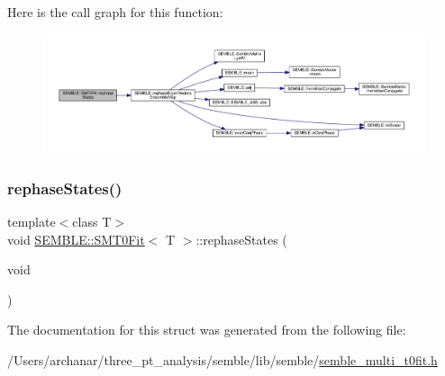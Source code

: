 Here is the call graph for this function\+:
\nopagebreak
\begin{figure}[H]
\begin{center}
\leavevmode
\includegraphics[width=350pt]{d6/dad/structSEMBLE_1_1SMT0Fit_ae6cc499f68d4bdb3b9c355fcde7905f7_cgraph}
\end{center}
\end{figure}
\mbox{\label{structSEMBLE_1_1SMT0Fit_ae6cc499f68d4bdb3b9c355fcde7905f7}} 
\subsubsection{\texorpdfstring{rephaseStates()}{rephaseStates()}\hspace{0.1cm}{\footnotesize\ttfamily [2/2]}}
{\footnotesize\ttfamily template$<$class T$>$ \\
void \mbox{\hyperlink{structSEMBLE_1_1SMT0Fit}{S\+E\+M\+B\+L\+E\+::\+S\+M\+T0\+Fit}}$<$ T $>$\+::rephase\+States (\begin{DoxyParamCaption}\item[{void}]{ }\end{DoxyParamCaption})}



The documentation for this struct was generated from the following file\+:\begin{DoxyCompactItemize}
\item 
/\+Users/archanar/three\+\_\+pt\+\_\+analysis/semble/lib/semble/\mbox{\hyperlink{lib_2semble_2semble__multi__t0fit_8h}{semble\+\_\+multi\+\_\+t0fit.\+h}}\end{DoxyCompactItemize}
